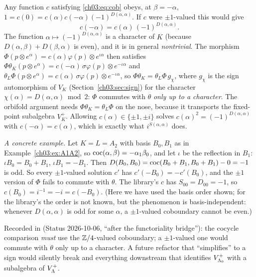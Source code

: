 \begin{remark}\label{ch03:rem:Z4}
Any function $c$ satisfying \eqref{ch03:eq:cob} obeys, at $\beta=-\alpha$,
$1=c(0)=c(\alpha)c(-\alpha)(-1)^{D(\alpha,\alpha)}$. If $c$ were $\pm1$-valued this would give
\begin{equation*}
  c(-\alpha)=c(\alpha)\,(-1)^{D(\alpha,\alpha)} .
\end{equation*}
The function $\alpha\mapsto(-1)^{D(\alpha,\alpha)}$ is a character of $K$ (because
$D(\alpha,\beta)+D(\beta,\alpha)$ is even), and it is in general \emph{nontrivial}. The morphism
$\Phi(p\otimes e^\alpha)=c(\alpha)\varphi(p)\otimes e^{\iota\alpha}$ then satisfies
$\Phi\theta_K(p\otimes e^\alpha)=c(-\alpha)\,\sigma\varphi(p)\otimes e^{-\iota\alpha}$ and
$\theta_L\Phi(p\otimes e^\alpha)=c(\alpha)\,\sigma\varphi(p)\otimes e^{-\iota\alpha}$, so
$\Phi\theta_K=\theta_L\Phi\,g_\chi$, where $g_\chi$ is the sign automorphism of $V_K$
(Section~\ref{ch03:sec:sign}) for the character $\chi(\alpha)=D(\alpha,\alpha)\bmod 2$: $\Phi$
commutes with $\theta$ \emph{only up to a character}. The orbifold argument needs
$\Phi\theta_K=\theta_L\Phi$ on the nose, because it transports the fixed-point subalgebra
$V_K^+$. Allowing $c(\alpha)\in\{\pm1,\pm i\}$ solves $c(\alpha)^2=(-1)^{D(\alpha,\alpha)}$ with
$c(-\alpha)=c(\alpha)$, which is exactly what $i^{S(\alpha,\alpha)}$ does.

\emph{A concrete example.} Let $K=L=A_2$ with basis $B_0,B_1$ as in Example~\ref{ch03:ex:A1A2},
so $\operatorname{coc}(\alpha,\beta)=-\alpha_1\beta_0$, and let $\iota$ be the reflection in $B_1$:
$\iota B_0=B_0+B_1$, $\iota B_1=-B_1$. Then $D(B_0,B_0)=\operatorname{coc}(B_0+B_1,B_0+B_1)-0=-1$ is odd.
So every $\pm1$-valued solution $c'$ has $c'(-B_0)=-c'(B_0)$, and the $\pm1$ version of $\Phi$
fails to commute with $\theta$. The library's $c$ has $S_{00}=D_{00}=-1$, so $c(B_0)=i^{-1}=-i=
c(-B_0)$. (Here we have used the basis order shown; for the library's  the order
is not known, but the phenomenon is basis-independent: whenever $D(\alpha,\alpha)$ is odd for some
$\alpha$, a $\pm1$-valued coboundary cannot be even.)
\end{remark}

\begin{warning}
Recorded in  (Status 2026-10-06, ``after the functoriality
bridge''): the cocycle comparison \emph{must} use the ${\mathbb{Z}}/4$-valued coboundary; a $\pm1$-valued
one would commute with $\theta$ only up to a character. A future refactor that ``simplifies''
 to a sign would silently break  and everything downstream
that identifies $V_{{\Lambda}_0}^+$ with a subalgebra of $V_{\Lambda}^+$.
\end{warning}

